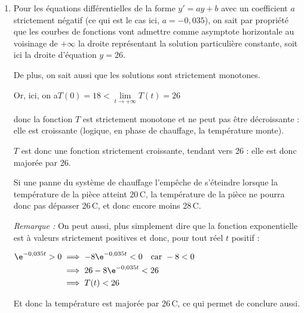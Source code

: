 \begin{enumerate}
			$\dfrac{\ln(0,75)}{-0,035} \approx 8,22$.

			Le temps est exprimé en dizaine de minutes. 8,22 dizaines de minutes, correspondent, à la minute près à 82 minutes, soit 1 heure et 22 minutes.

			À la minute près, il faut donc 1 heure et 22 minutes pour que la température atteigne les 20\,\textdegree{}C.

			\item Pour les équations différentielles de la forme \quad $y' = ay + b$ \quad avec un coefficient $a$ strictement négatif (ce qui est le cas ici, $a = -0,035$), on sait par propriété que les courbes de fonctions vont admettre comme asymptote horizontale au voisinage de $+\infty$ la droite représentant la solution particulière constante, soit ici la droite d'équation $y = 26$.

			De plus, on sait aussi que les solutions sont strictement monotones.

			Or, ici, on a\quad $T(0) = 18 < \lim\limits_{t \to +\infty}T(t) = 26$

			donc la fonction $T$ est strictement monotone et ne peut pas être décroissante : elle est croissante (logique, en phase de chauffage, la température monte).

			$T$ est donc une fonction strictement croissante, tendant vers 26 : elle est donc majorée par 26.

			Si une panne du système de chauffage l'empêche de s'éteindre lorsque la température de la pièce atteint 20\,\textdegree{}C, la température de la pièce ne pourra donc pas dépasser 26\,\textdegree{}C, et donc encore moins 28\,\textdegree{}C.

			\emph{Remarque :} On peut aussi, plus simplement dire que la fonction exponentielle est à valeurs strictement positives et donc, pour tout réel $t$ positif :

			$\begin{aligned}
				\e^{-0,035t} > 0
					&\implies -8\e^{-0,035t} < 0\quad \text{car } -8<0\\
					&\implies 26 -8\e^{-0,035t} < 26\\
					&\implies T(t) < 26
			\end{aligned}$

			Et donc la température est majorée par 26\,\textdegree{}C, ce qui permet de conclure aussi.
		\end{enumerate}


